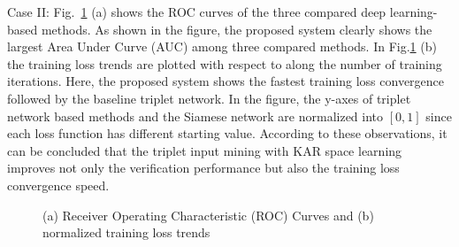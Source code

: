 \documentclass[sigconf]{acmart}
\begin{document}
Case II: Fig.~\ref{fig2} (a) shows the ROC curves of the three compared deep learning-based methods. As shown in the figure, the proposed system clearly shows the largest Area Under Curve (AUC) among three compared methods. In Fig.\ref{fig2} (b) the training loss trends are plotted with respect to along the number of training iterations. Here, the proposed system shows the fastest training loss convergence followed by the baseline triplet network. In the figure, the y-axes of triplet network based methods and the Siamese network are normalized into $[0,1]$ since each loss function has different starting value. According to these observations, it can be concluded that the triplet input mining with KAR space learning improves not only the verification performance but also the training loss convergence speed.
\begin{figure}[!ht]
    \begin{center}
    \caption{(a) Receiver Operating Characteristic (ROC) Curves and 
    (b) normalized training loss trends}
    \label{fig2}
    \end{center}
 \end{figure}
\end{document}
